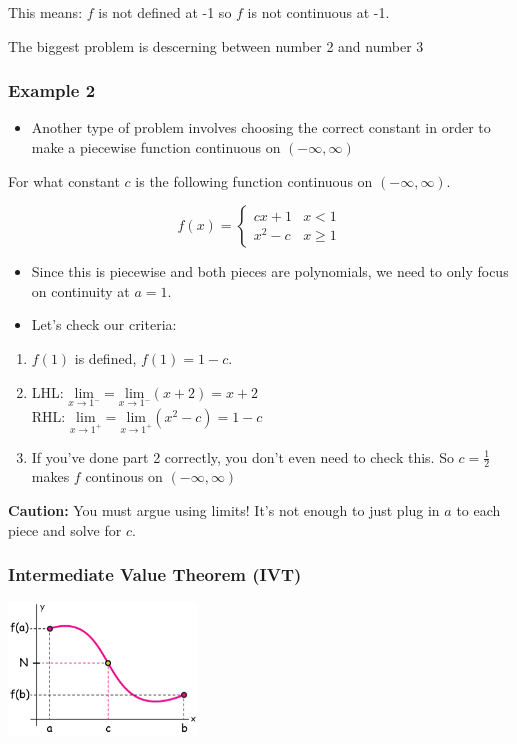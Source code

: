 \documentclass[11pt]{article}
\theoremstyle{plain}
\theoremstyle{definition}
\begin{document}
This means: $f$ is not defined at -1 so $f$ is not continuous at -1.

The biggest problem is descerning between number 2 and number 3


\subsubsection{Example 2}
\begin{itemize}
	\item Another type of problem involves choosing the correct constant in order to make a piecewise function continuous on $(-\infty, \infty)$
\end{itemize}

For what constant $c$ is the following function continuous on $(-\infty, \infty)$.

$$f(x)=\begin{cases} 
      		cx+1 & x < 1 \\
      		x^2-c & x \geq 1 
   		\end{cases}$$

\begin{itemize}
	\item Since this is piecewise and both pieces are polynomials, we need to only focus on continuity at $a=1$.
	\item Let's check our criteria:
\end{itemize}

\begin{enumerate}
	\item $f(1)$ is defined, $f(1)=1-c$.
	\item LHL: $\underset{x\rightarrow 1^-}{\text{lim}}= \underset{x\rightarrow 1^-}{\text{lim}}(x+2)=x+2$ \\
		RHL: $\underset{x\rightarrow 1^+}{\text{lim}}= \underset{x\rightarrow 1^+}{\text{lim}}(x^2-c)=1-c$
	\item If you've done part 2 correctly, you don't even need to check this. So $c=\frac{1}{2}$ makes $f$ continous on $(-\infty,\infty)$
\end{enumerate}

\textbf{Caution:} You must argue using limits! It's not enough to just plug in $a$ to each piece and solve for $c$.


\subsubsection{Intermediate Value Theorem (IVT)}

\begin{center}\includegraphics[width=5cm]{images/IntermediateValueTheoremGraph}\end{center}
\end{document}
